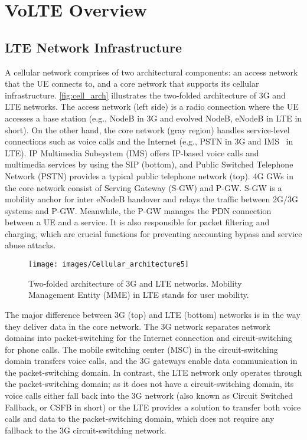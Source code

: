 \chapter{VoLTE Overview}
\label{sec:back}

\section{LTE Network Infrastructure}
\label{sec:cellular}

A cellular network comprises of two architectural components: an access
network that the UE connects to, and a core network that supports its
cellular infrastructure.
%
\autoref{fig:cell_arch} illustrates the two-folded architecture of 3G
and LTE networks. The access network (left side) is a radio connection
where the UE accesses a base station (e.g., NodeB in 3G and evolved
NodeB, \mbox{eNodeB} in LTE in short).
%
On the other hand, the core network (gray region) handles
service-level connections such as voice calls and the Internet (e.g.,
PSTN in 3G and IMS~\cite{3gpp_ims} in LTE).
%
IP Multimedia Subsystem (IMS) offers IP-based voice calls and multimedia
services by using the SIP (bottom), and Public Switched Telephone
Network (PSTN) provides a typical public telephone network (top).
%
4G GWs in the core network consist of Serving Gateway (S-GW) and P-GW.  S-GW is
a mobility anchor for inter eNodeB handover and relays the traffic between 2G/3G
systems and P-GW. Meanwhile, the P-GW manages the PDN connection between a UE
and a service.  It is also responsible for packet filtering and charging, which
are crucial functions for preventing accounting bypass and service abuse
attacks.

\begin{figure}[h]
  \centering
  \texttt{[image: images/Cellular\_architecture5]}
  \caption{Two-folded architecture of 3G and LTE networks. Mobility
    Management Entity (MME) in LTE stands for user mobility.
  }

  \label{fig:cell_arch}
\end{figure}
 
The major difference between 3G (top) and LTE (bottom) networks is in the
way they deliver data in the core network. The 3G network separates 
network domains into packet-switching for the Internet connection and
circuit-switching for phone calls.
%
The mobile switching center (MSC) in the circuit-switching domain transfers voice calls,
and the 3G gateways enable data communication in the packet-switching domain.
%
In contrast, the LTE network only operates through the packet-switching
domain; as it does not have a circuit-switching domain, its voice calls either fall
back into the 3G network (also known as Circuit Switched Fallback, or CSFB
in short) or
%
the LTE provides a \vt solution to transfer both voice calls and data
to the packet-switching domain, which does not require any fallback to the 3G circuit-switching
network.

